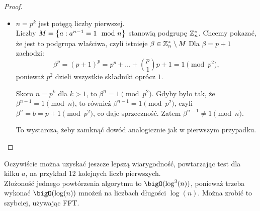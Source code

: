 \begin{proof}
\begin{itemize}
		\item \( n = p^k \) jest potęgą liczby pierwszej. \\
		      Liczby \( M = \set{a : a^{n-1} = 1 \mod n} \) stanowią podgrupę \( \mathbb{Z}_n^* \). Chcemy pokazać, że jest to podgrupa właściwa, czyli istnieje \( \beta \in \mathbb{Z}_n^* \setminus M \)
		      Dla \( \beta = p + 1 \) zachodzi:
		      \[
			      \beta^p = (p + 1)^p = p^p + \ldots + \binom{p}{1} p + 1 = 1 \pmod{p^2},
		      \]
		      ponieważ \( p^2 \) dzieli wszystkie składniki oprócz \( 1 \).

		      Skoro \( n = p^k \) dla \( k > 1 \), to \( \beta^n = 1 \pmod{p^2} \).
		      Gdyby było tak, że \( \beta^{n-1} = 1 \pmod{n} \), to również \( \beta^{n-1} = 1 \pmod{p^2} \), czyli \( \beta^n = b = p + 1 \pmod{p^2} \), co daje sprzeczność. Zatem \( \beta^{n-1} \neq 1 \pmod{n} \).

		      To wystarcza, żeby zamknąć dowód analogicznie jak w pierwszym przypadku.
	\end{itemize}
\end{proof}
Oczywiście można uzyskać jeszcze lepszą wiarygodność, powtarzając test dla kilku \( a \), na przykład 12 kolejnych liczb pierwszych. \\
Złożoność jednego powtórzenia algorytmu to \( \bigO(\log^3(n)) \), ponieważ trzeba wykonać \( \bigO(\log(n)) \) mnożeń na liczbach długości \( \log(n) \). Można zrobić to szybciej, używając FFT.

